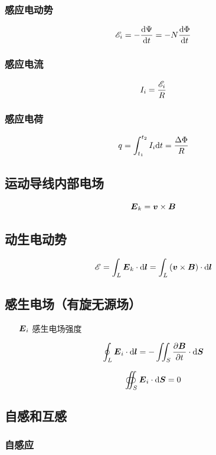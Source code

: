 \documentclass{article}
\begin{document}
\subsubsection{感应电动势}

\[\mathscr E_i=-\frac{\mathrm d\Psi}{\mathrm d t}=-N\frac{\mathrm d\Phi}{\mathrm d t}\]

\subsubsection{感应电流}

\[I_i=\frac{\mathscr E_i}R\]

\subsubsection{感应电荷}

\[q=\int_{t_1}^{t_2}I_i\mathrm d t=\frac{\Delta\Phi}R\]

\subsection{运动导线内部电场}

\[\boldsymbol{E}_k=\boldsymbol{v}\times\boldsymbol{B}\]

\subsection{动生电动势}

\[\mathscr E=\int_L\boldsymbol{E}_k\cdot\mathrm d\boldsymbol{l}=\int_L\left(\boldsymbol{v}\times\boldsymbol{B}\right)\cdot\mathrm d\boldsymbol{l}\]

\subsection{感生电场（有旋无源场）}

\begin{enumerate}
    \item [$\boldsymbol{E}_i$] 感生电场强度
\end{enumerate}

\[\oint_L\boldsymbol{E}_i\cdot\mathrm d\boldsymbol{l}=-\iint_S\frac{\partial\boldsymbol{B}}{\partial t}\cdot\mathrm d\boldsymbol{S}\]

\[\oiint_S\boldsymbol{E}_i\cdot\mathrm d\boldsymbol{S}=0\]

\subsection{自感和互感}

\subsubsection{自感应}
\end{document}
